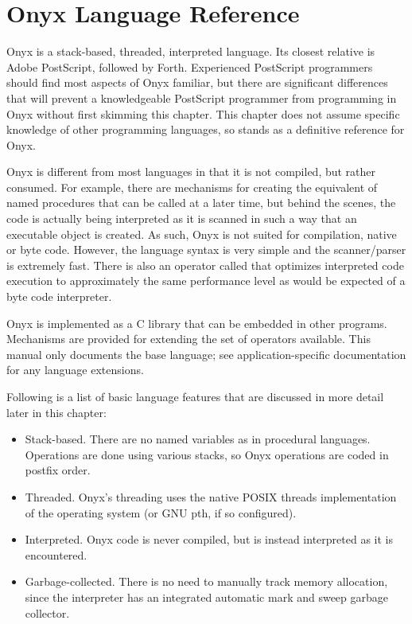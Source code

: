 %
%
%
%
%

\clearemptydoublepage
\chapter{Onyx Language Reference}
\label{onyxlang}

Onyx is a stack-based, threaded, interpreted language.  Its closest relative is
Adobe PostScript, followed by Forth.  Experienced PostScript programmers should
find most aspects of Onyx familiar, but there are significant differences that
will prevent a knowledgeable PostScript programmer from programming in Onyx
without first skimming this chapter.  This chapter does not assume specific
knowledge of other programming languages, so stands as a definitive reference
for Onyx.

Onyx is different from most languages in that it is not compiled, but rather
consumed.  For example, there are mechanisms for creating the equivalent of
named procedures that can be called at a later time, but behind the scenes, the
code is actually being interpreted as it is scanned in such a way that an
executable object is created.  As such, Onyx is not suited for compilation,
native or byte code.  However, the language syntax is very simple and the
scanner/parser is extremely fast.  There is also an operator called
 that optimizes interpreted code
execution to approximately the same performance level as would be expected of a
byte code interpreter.

Onyx is implemented as a C library that can be embedded in other programs.
Mechanisms are provided for extending the set of operators available.  This
manual only documents the base language; see application-specific documentation
for any language extensions.

Following is a list of basic language features that are discussed in more detail
later in this chapter:

\begin{itemize}
\item{Stack-based.  There are no named variables as in procedural languages.
Operations are done using various stacks, so Onyx operations are coded in
postfix order.}
\item{Threaded.  Onyx's threading uses the native POSIX threads implementation
of the operating system (or GNU pth, if so configured).}
\item{Interpreted.  Onyx code is never compiled, but is instead interpreted as
it is encountered.}
\item{Garbage-collected.  There is no need to manually track memory allocation,
since the interpreter has an integrated automatic mark and sweep garbage
collector.}
\end{itemize}

